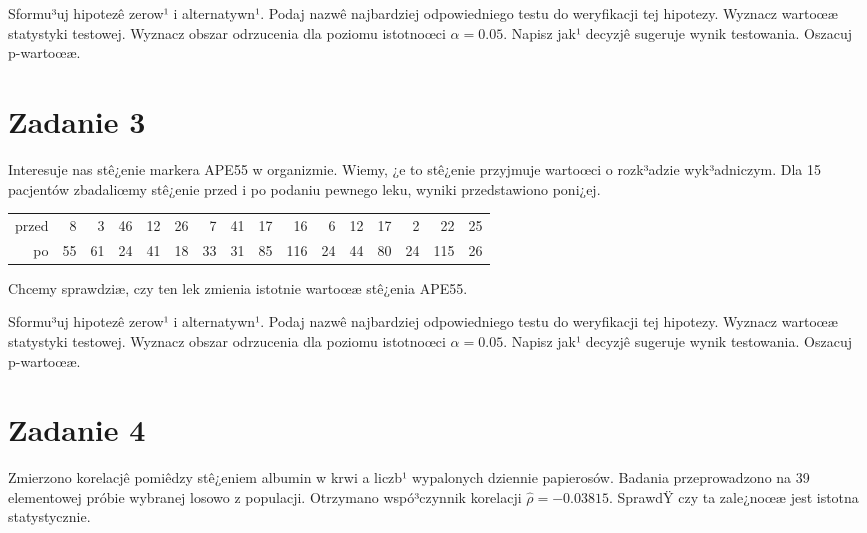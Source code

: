\documentclass[a4paper,12pt]{article}
\begin{document}
  Sformu³uj hipotezê zerow¹ i alternatywn¹. 
  Podaj nazwê najbardziej odpowiedniego testu do weryfikacji tej hipotezy. 
  Wyznacz wartoœæ statystyki testowej. 
  Wyznacz obszar odrzucenia dla poziomu istotnoœci $\alpha=0.05$. 
  Napisz jak¹ decyzjê sugeruje wynik testowania. Oszacuj p-wartoœæ. \vspace{1cm} 

  \section*{Zadanie 3}
     
  Interesuje nas stê¿enie markera APE55  w organizmie. 
  Wiemy, ¿e to stê¿enie przyjmuje wartoœci o rozk³adzie wyk³adniczym. 
  Dla 15 pacjentów zbadaliœmy stê¿enie przed i po podaniu pewnego leku, 
  wyniki przedstawiono poni¿ej.
  
  \vspace{0.5cm} 
  \noindent\begin{center} 
\begin{tabular}{rrrrrrrrrrrrrrrr}
  \hline
  \hline
przed & 8 & 3 & 46 & 12 & 26 & 7 & 41 & 17 & 16 & 6 & 12 & 17 & 2 & 22 & 25 \\
  po & 55 & 61 & 24 & 41 & 18 & 33 & 31 & 85 & 116 & 24 & 44 & 80 & 24 & 115 & 26 \\
   \hline
\end{tabular}
 
  \end{center} 
  \vspace{0.5cm}
  
  Chcemy sprawdziæ, czy ten lek zmienia istotnie wartoœæ stê¿enia APE55.
  
  Sformu³uj hipotezê zerow¹ i alternatywn¹. 
  Podaj nazwê najbardziej odpowiedniego testu do weryfikacji tej hipotezy. 
  Wyznacz wartoœæ statystyki testowej. 
  Wyznacz obszar odrzucenia dla poziomu istotnoœci $\alpha=0.05$. 
  Napisz jak¹ decyzjê sugeruje wynik testowania. Oszacuj p-wartoœæ. \vspace{1cm} 

  \section*{Zadanie 4}
     
     Zmierzono korelacjê pomiêdzy stê¿eniem albumin w krwi a liczb¹ wypalonych dziennie papierosów. 
     Badania przeprowadzono na 39 elementowej próbie wybranej losowo z populacji. 
     Otrzymano wspó³czynnik korelacji $\hat\rho = -0.03815 $. 
     SprawdŸ czy ta zale¿noœæ jest istotna statystycznie. 
     
\end{document}
